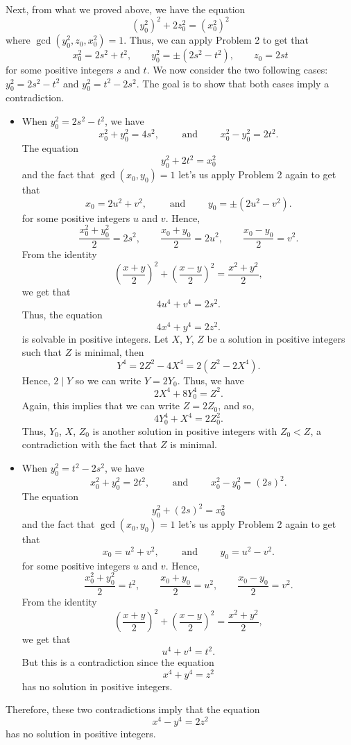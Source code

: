 \begin{solution}
    Next, from what we proved above, we have the equation
    $$(y_0^2)^2 + 2z_0^2 = (x_0^2)^2$$
    where $\gcd(y_0^2, z_0, x_0^2) = 1$. Thus, we can apply Problem 2 to get that
    $$x_0^2 = 2s^2 + t^2, \qquad y_0^2 = \pm(2s^2 - t^2), \qquad z_0 = 2st$$
    for some positive integers $s$ and $t$. We now consider the two following cases: $y_0^2 = 2s^2 - t^2$ and $y_0^2 = t^2 - 2s^2$. The goal is to show that both cases imply a contradiction.
    \begin{itemize}
        \item When $y_0^2 = 2s^2 - t^2$, we have
        $$x_0^2 + y_0^2 = 4s^2, \qquad \text{ and } \qquad x_0^2 - y_0^2 = 2t^2.$$
        The equation 
        $$y_0^2 + 2t^2 = x_0^2$$
        and the fact that $\gcd(x_0, y_0) = 1$ let's us apply Problem 2 again to get that
        $$x_0 = 2u^2 + v^2, \qquad \text{ and } \qquad y_0 = \pm(2u^2 - v^2).$$
        for some positive integers $u$ and $v$. Hence, 
        $$\frac{x_0^2 + y_0^2}{2} = 2s^2, \qquad \frac{x_0 + y_0}{2} = 2u^2, \qquad \frac{x_0 - y_0}{2} = v^2.$$ 
        From the identity
        $$\left(\frac{x + y}{2}\right)^2 + \left(\frac{x - y}{2}\right)^2 = \frac{x^2 + y^2}{2},$$
        we get that
        $$4u^4 + v^4 = 2s^2.$$
        Thus, the equation
        $$4x^4 + y^4 = 2z^2.$$
        is solvable in positive integers. Let $X$, $Y$, $Z$ be a solution in positive integers such that $Z$ is minimal, then
        $$Y^4 = 2Z^2 - 4X^4 = 2(Z^2 - 2X^4).$$
        Hence, $2\mid Y$ so we can write $Y = 2Y_0$. Thus, we have
        $$2X^4 + 8Y_0^4 = Z^2.$$
        Again, this implies that we can write $Z = 2Z_0$, and so,
        $$4Y_0^4 + X^4 = 2Z_0^2.$$
        Thus, $Y_0$, $X$, $Z_0$ is another solution in positive integers with $Z_0 < Z$, a contradiction with the fact that $Z$ is minimal.
        \item When $y_0^2 = t^2 - 2s^2$, we have
        $$x_0^2 + y_0^2 = 2t^2, \qquad \text{ and } \qquad x_0^2 - y_0^2 = (2s)^2.$$
        The equation 
        $$y_0^2 + (2s)^2 = x_0^2$$
        and the fact that $\gcd(x_0, y_0) = 1$ let's us apply Problem 2 again to get that
        $$x_0 = u^2 + v^2, \qquad \text{ and } \qquad y_0 = u^2 - v^2.$$
        for some positive integers $u$ and $v$. Hence, 
        $$\frac{x_0^2 + y_0^2}{2} = t^2, \qquad \frac{x_0 + y_0}{2} = u^2, \qquad \frac{x_0 - y_0}{2} = v^2.$$ 
        From the identity
        $$\left(\frac{x + y}{2}\right)^2 + \left(\frac{x - y}{2}\right)^2 = \frac{x^2 + y^2}{2},$$
        we get that
        $$u^4 + v^4 = t^2.$$
        But this is a contradiction since the equation 
        $$x^4 + y^4 = z^2$$
        has no solution in positive integers.
    \end{itemize}
    Therefore, these two contradictions imply that the equation
    $$x^4 - y^4 = 2z^2$$
    has no solution in positive integers.\\
\end{solution}

